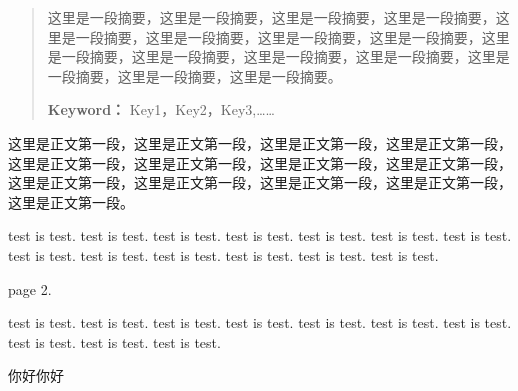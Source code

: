 
\begin{abstract}
	
	这里是一段摘要，这里是一段摘要，这里是一段摘要，这里是一段摘要，这里是一段摘要，这里是一段摘要，这里是一段摘要，这里是一段摘要，这里是一段摘要，这里是一段摘要，这里是一段摘要，这里是一段摘要，这里是一段摘要，这里是一段摘要，这里是一段摘要。
	
	\noindent \textbf{Keyword：} Key1，Key2，Key3,……
\end{abstract}

这里是正文第一段，这里是正文第一段，这里是正文第一段，这里是正文第一段，这里是正文第一段，这里是正文第一段，这里是正文第一段，这里是正文第一段，这里是正文第一段，这里是正文第一段，这里是正文第一段，这里是正文第一段，这里是正文第一段。

test is test. test is test. test is test. test is test. test is test. test is test. test is test. test is test. test is test. test is test. test is test. test is test. test is test. 

\newpage 

page 2.

test is test. test is test. test is test. test is test. test is test. test is test. test is test. test is test. test is test. test is test. 

你好你好